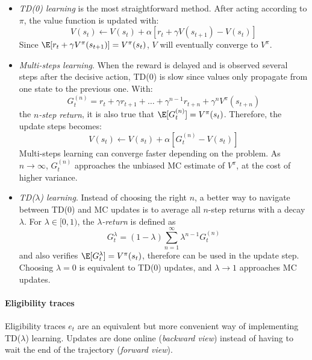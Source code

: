 \begin{itemize}
    \item \emph{TD(0) learning} is the most straightforward method. After acting according to $\pi$, the value function is updated with: 
    \[
        V(s_t) \leftarrow V(s_t) + \alpha [r_t + \gamma V(s_{t+1}) - V(s_t)]
    \]
    Since $\E[r_t + \gamma V^\pi(s_{t+1})] = V^\pi(s_t)$, $V$ will eventually converge to $V^\pi$. 
    
    \item \emph{Multi-steps learning}. When the reward is delayed and is observed several steps after the decisive action, TD(0) is slow since values only propagate from one state to the previous one. With:
    \[
        G_t^{(n)} = r_t + \gamma r_{t+1} + \dots + \gamma^{n-1} r_{t+n} + \gamma^n V^\pi(s_{t+n})
    \]
    the \emph{$n$-step return}, it is also true that $\E[G_t^{(n)}] = V^\pi(s_t)$. Therefore, the update steps becomes: 
    \[
        V(s_t) \leftarrow V(s_t) + \alpha [G_t^{(n)} - V(s_t)]
    \]
    Multi-steps learning can converge faster depending on the problem. As $n \rightarrow \infty$, $G_t^{(n)}$ approaches the unbiased MC estimate of $V^\pi$, at the cost of higher variance.

    \item \emph{TD($\lambda$) learning}. Instead of choosing the right $n$, a better way to navigate between TD(0) and MC updates is to average all $n$-step returns with a decay $\lambda$. For $\lambda \in [0,1)$, the \emph{$\lambda$-return} is defined as
    \[
        G_t^\lambda = (1-\lambda) \sum_{n=1}^\infty \lambda^{n-1} G_t^{(n)}
    \]
    and also verifies $\E[G_t^\lambda] = V^\pi(s_t)$, therefore can be used in the update step. Choosing $\lambda=0$ is equivalent to TD(0) updates, and $\lambda \rightarrow 1$ approaches MC updates.
\end{itemize}


\paragraph{Eligibility traces} Eligibility traces $e_t$ are an equivalent but more convenient way of implementing TD($\lambda$) learning. Updates are done online (\emph{backward view}) instead of having to wait the end of the trajectory (\emph{forward view}).

